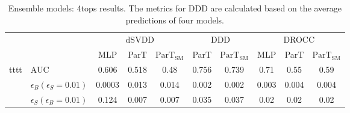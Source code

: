 \begin{table}[H]
    \centering
    \setlength{\tabcolsep}{4pt}
    \begin{tabular}{ll|ccc|cc|ccc}
    \hline
    \multicolumn{2}{c|}{} & \multicolumn{3}{c|}{dSVDD} & \multicolumn{2}{c|}{DDD} & \multicolumn{3}{c}{DROCC} \\
     & & MLP & ParT & $\text{ParT}_{\text{SM}}$ & ParT & $\text{ParT}_{\text{SM}}$ & MLP & ParT & $\text{ParT}_{\text{SM}}$ \\ 
    \hline \hline
    \multirow{3}{*}{tttt} & AUC & 0.606 & 0.518 & 0.48 & 0.756 & 0.739 & 0.71 & 0.55 & 0.59 \\
    & $\epsilon_B(\epsilon_S=0.01)$           & 0.0003 & 0.013 & 0.014 & 0.002 & 0.002 & 0.003   & 0.004   & 0.004   \\
    & $\epsilon_S(\epsilon_B=0.01)$           & 0.124 & 0.007 & 0.007 & 0.035 & 0.037 & 0.02 & 0.02 & 0.02 \\
    \hline  
    \hline  
    \end{tabular}
    \caption{Ensemble models: 4tops results. The metrics for DDD are calculated based on the average predictions of four models.}
    \label{tab:4top_all}
\end{table}